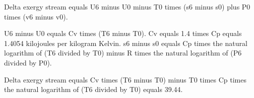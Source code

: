 Delta exergy stream equals U6 minus U0 minus T0 times (s6 minus s0) plus P0 times (v6 minus v0).

U6 minus U0 equals Cv times (T6 minus T0). Cv equals 1.4 times Cp equals 1.4054 kilojoules per kilogram Kelvin.
s6 minus s0 equals Cp times the natural logarithm of (T6 divided by T0) minus R times the natural logarithm of (P6 divided by P0).

Delta exergy stream equals Cv times (T6 minus T0) minus T0 times Cp times the natural logarithm of (T6 divided by T0) equals 39.44.
